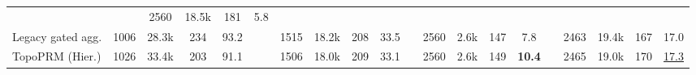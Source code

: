 \begin{table}[!htb]
{\begin{tabular}{@{}l cccc c cccc c cccc c cccc@{}}
  && 2560          & 18.5k          & 181          & 5.8 \\
Legacy gated agg.
  & 1006          & 28.3k          & 234          & 93.2
  && 1515          & 18.2k          & 208          & 33.5
  && 2560          & 2.6k           & 147          & 7.8
  && 2463          & 19.4k          & 167          & 17.0 \\
\rowcolor{blue!5}
TopoPRM (Hier.)
  & 1026          & 33.4k          & 203          & 91.1
  && 1506          & 18.0k          & 209          & 33.1
  && 2560          & 2.6k           & 149          & \textbf{10.4}
  && 2465          & 19.0k          & 170          & \underline{17.3} \\
\bottomrule
\end{tabular}%
}
\end{table}
